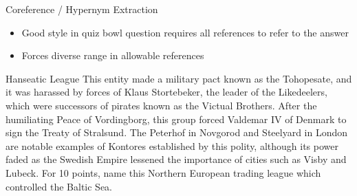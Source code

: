 \begin{frame}{Coreference / Hypernym Extraction}

\begin{itemize}
  \item Good style in quiz bowl question requires all references to refer to the answer
  \item Forces diverse range in allowable references
\end{itemize}

\pause

\begin{block}{Hanseatic League}
\alert<3>{This entity} made a military pact known as the Tohopesate, and \alert<3>{it} was harassed by forces of Klaus Stortebeker, the leader of the Likedeelers, which were successors of pirates known as the Victual Brothers. After the humiliating Peace of Vordingborg, \alert<3>{this group} forced Valdemar IV of Denmark to sign the Treaty of Stralsund. The Peterhof in Novgorod and Steelyard in London are notable examples of Kontores established by \alert<3>{this polity}, although \alert<3>{its} power faded as the Swedish Empire lessened the importance of cities such as Visby and Lubeck. For 10 points, name \alert<3>{this Northern European trading league} which controlled the Baltic Sea.
\end{block}

\end{frame}
